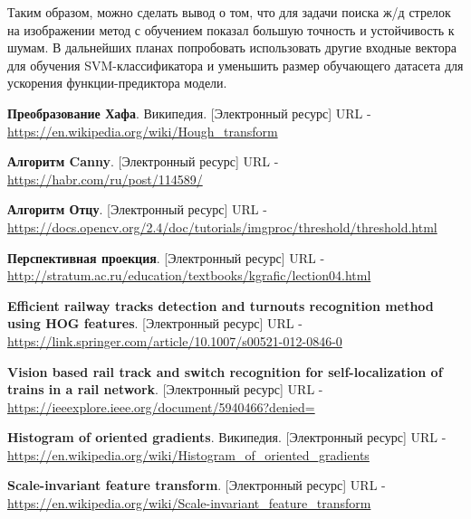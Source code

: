 Таким образом, можно сделать вывод о том, что для задачи поиска ж/д стрелок на изображении метод с обучением показал большую точность и устойчивость к шумам. В дальнейших планах попробовать использовать другие входные вектора для обучения SVM-классификатора и уменьшить размер обучающего датасета для ускорения функции-предиктора модели.

\newpage
\begin{thebibliography}{2}
	\textbf{Преобразование Хафа}. Википедия. [Электронный ресурс] URL - 
	\href{https://en.wikipedia.org/wiki/Hough\_transform}{https://en.wikipedia.org/wiki/Hough\_transform}
	
	\textbf{Алгоритм Canny}. [Электронный ресурс] URL - 
	\href{https://habr.com/ru/post/114589/}{https://habr.com/ru/post/114589/}
	
	\textbf{Алгоритм Отцу}. [Электронный ресурс] URL - 
	\href{https://docs.opencv.org/2.4/doc/tutorials/imgproc/threshold/threshold.html}{https://docs.opencv.org/2.4/doc/tutorials/imgproc/threshold/threshold.html}
	
	\textbf{Перспективная проекция}. [Электронный ресурс] URL - 
	\href{http://stratum.ac.ru/education/textbooks/kgrafic/lection04.html}{http://stratum.ac.ru/education/textbooks/kgrafic/lection04.html}
	
	\textbf{Efficient railway tracks detection and turnouts recognition method using HOG features}. [Электронный ресурс] URL - 
	\href{https://link.springer.com/article/10.1007/s00521-012-0846-0}{https://link.springer.com/article/10.1007/s00521-012-0846-0}
	
	\textbf{Vision based rail track and switch recognition for self-localization of trains in a rail network}. [Электронный ресурс] URL - 
	\href{https://ieeexplore.ieee.org/document/5940466?denied=}{https://ieeexplore.ieee.org/document/5940466?denied=}
	
	\textbf{Histogram of oriented gradients}. Википедия. [Электронный ресурс] URL - 
	\href{https://en.wikipedia.org/wiki/Histogram_of_oriented_gradients}{https://en.wikipedia.org/wiki/Histogram\_of\_oriented\_gradients}
	
	\textbf{Scale-invariant feature transform}. [Электронный ресурс] URL - 
	\href{https://en.wikipedia.org/wiki/Scale-invariant_feature_transform}{https://en.wikipedia.org/wiki/Scale-invariant\_feature\_transform}
	

\end{thebibliography}
